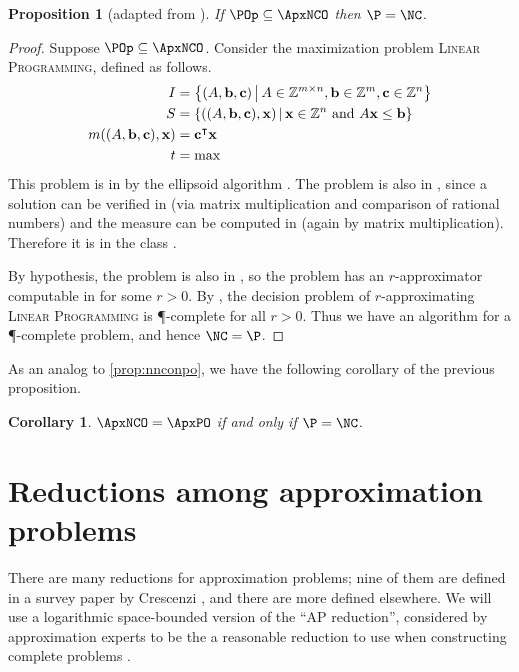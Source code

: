 \documentclass[]{article}
\theoremstyle{plain}
\newtheorem{corollary}{Corollary}
\newtheorem{proposition}{Proposition}
\theoremstyle{definition}
\let\originalleft\left
\let\originalright\right
\renewcommand{\left}{\mathopen{}\mathclose\bgroup\originalleft}
\renewcommand{\right}{\aftergroup\egroup\originalright}
\begin{document}
\begin{proposition}[adapted from {\cite[Theorem~8.2.9]{dsst97}}]
  If $\POp \subseteq \ApxNCO$ then $\P = \NC$.
\end{proposition}
\begin{proof}
  Suppose $\POp \subseteq \ApxNCO$.
  Consider the maximization problem \textsc{Linear Programming}, defined as follows.
  \begin{align*}
    I & = \left\{(A, \mathbf{b}, \mathbf{c}) \, \middle| \, A \in \mathbb{Z}^{m \times n}, \mathbf{b} \in \mathbb{Z}^m, \mathbf{c} \in \mathbb{Z}^n \right\} \\
    S & = \left\{((A, \mathbf{b}, \mathbf{c}), \mathbf{x}) \, \middle| \, \mathbf{x} \in \mathbb{Z}^n \text{ and } A\mathbf{x} \leq \mathbf{b}\right\} \\
    m((A, \mathbf{b}, \mathbf{c}), \mathbf{x}) & = \mathbf{c}^\intercal\mathbf{x} \\
    t & = \max
  \end{align*}
  This problem is in \PO{} by the ellipsoid algorithm \cite{khachian79}.
  The problem is also in \NNCO{}, since a solution can be verified in \NC{} (via matrix multiplication and comparison of rational numbers) and the measure can be computed in \NC{} (again by matrix multiplication).
  Therefore it is in the class \POp.

  By hypothesis, the problem is also in \ApxNCO{}, so the problem has an $r$-approximator computable in \NC{} for some $r > 0$.
  By \cite[Theorem~8.2.7]{dsst97}, the decision problem of $r$-approximating \textsc{Linear Programming} is \P-complete for all $r > 0$.
  Thus we have an \NC{} algorithm for a \P-complete problem, and hence $\NC = \P$.
\end{proof}

As an analog to \autoref{prop:nnconpo}, we have the following corollary of the previous proposition.

\begin{corollary}
  $\ApxNCO = \ApxPO$ if and only if $\P = \NC$.
\end{corollary}

\section{Reductions among approximation problems}

There are many reductions for approximation problems; nine of them are defined in a survey paper by Crescenzi \cite{crescenzi97}, and there are more defined elsewhere.
We will use a logarithmic space-bounded version of the ``AP reduction'', considered by approximation experts to be the a reasonable reduction to use when constructing complete problems \cite[Section~2]{crescenzi97} \cite[Section~8.6]{acgkmp99}.
\end{document}
